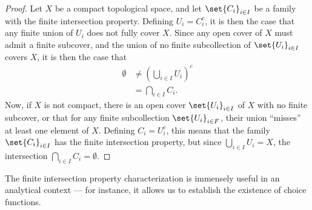 \documentclass[10pt]{mypackage}
\begin{document}
\begin{proof}
  Let $X$ be a compact topological space, and let $\set{C_i}_{i\in I}$ be a family with the finite intersection property. Defining $U_i = C_i^{c}$, it is then the case that any finite union of $U_i$ does not fully cover $X$. Since any open cover of $X$ must admit a finite subcover, and the union of no finite subcollection of $\set{U_i}_{i\in I}$ covers $X$, it is then the case that
  \begin{align*}
    \emptyset &\neq \left( \bigcup_{i\in I}U_i \right)^{c}\\
              &= \bigcap_{i\in I}C_i.
  \end{align*}
  Now, if $X$ is not compact, there is an open cover $\set{U_i}_{i\in I}$ of $X$ with no finite subcover, or that for any finite subcollection $\set{U_i}_{i\in F}$, their union ``misses'' at least one element of $X$. Defining $C_i = U_i^{c}$, this means that the family $\set{C_i}_{i\in I}$ has the finite intersection property, but since $\bigcup_{i\in I}U_i = X$, the intersection $\bigcap_{i\in I}C_i = \emptyset$.
\end{proof}
The finite intersection property characterization is immensely useful in an analytical context --- for instance, it allows us to establish the existence of choice functions.
\end{document}
